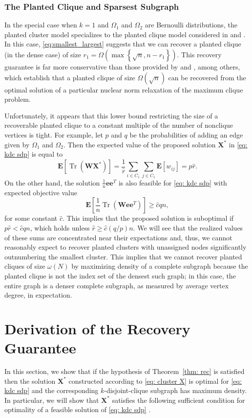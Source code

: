 \documentclass[twoside,11pt]{article}
\newcommand{\E}{\mathbf{E}}
\DeclareMathOperator{\tr}{{Tr}}
\newcommand{\e}{\bs {e}}
\newcommand{\bs}{\boldsymbol}
\newcommand{\X}{\bs {X}}
\newcommand{\W}{\bs {W}}
\newcommand{\0}{\bs{0}}
\newcommand{\sbra}[1] {\ensuremath{ \left[ #1\right]}} %
\newcommand{\rbra}[1]{\ensuremath{\left( #1 \right)}} %
\newcommand{\bra}[1]{\ensuremath{\left\{ #1 \right\}}} %
\newcommand{\kdc}{\(k\)-disjoint-clique }
\begin{document}
{\subsubsection{The Planted Clique and Sparsest Subgraph}

In the special case when $k=1$ and $\Omega_1$ and $\Omega_2$
are Bernoulli distributions, the planted cluster model
specializes to the planted clique model considered in
\cite{ames2011nuclear} and \cite{ames2015guaranteed}.
In this case, \eqref{eq:smallest_largest}
suggests that we can recover a planted clique (in the dense
case) of size $r_1 = \Omega \rbra{ \max \bra{\sqrt{n}, n - r_1 } }$.
This recovery guarantee is far more conservative than those
provided by \cite{ames2011nuclear} and \cite{ames2015guaranteed},
among others,
which establish that a planted clique
of size $\Omega(\sqrt n)$ can be recovered from the optimal solution
of a particular nuclear norm relaxation of the maximum clique problem.

Unfortunately, it appears that this lower bound restricting the size
of a recoverable planted clique
to a constant multiple of the number of nonclique vertices
is tight.
For example, let $p$ and $q$ be the probabilities of adding an edge
given by $\Omega_1$ and $\Omega_2$.
Then the expected value of the proposed solution $\X^*$
in \eqref{eq: kdc sdp}
is equal to
$$
	\E [ \tr(\W \X^*)] = \frac{1}{\hat r} \sum_{i \in C_1} \sum_{j \in C_1}
		\E[w_{ij} ] = p \hat r.
$$
On the other hand, the solution $\frac{1}{n} \e\e^T$ is also
feasible for \eqref{eq: kdc sdp} with expected objective value
$$
	\E \sbra{ \frac{1}{n} \tr(\W \e\e^T) }
	 \ge \hat c q n,
$$
for some constant $\hat c$.
This implies that the proposed solution is suboptimal if
$p \hat r < \hat c q n$, which holds unless $\hat r \ge \hat c (q/p) n$.
We will see that the realized values of these sums
are concentrated near their expectations and, thus, we cannot
reasonably expect to recover planted clusters with unassigned nodes significantly
outnumbering the smallest cluster. This implies that we cannot
recover planted cliques of size $\omega(N)$ by maximizing
density of a complete subgraph because the planted clique
is not the index set of the densest such graph; in this case, the
entire graph is a denser
complete subgraph, as measured by average vertex degree,
in expectation.

\section{Derivation of the Recovery Guarantee}
\label{sec: proof}
In this section, we show that if the hypothesis of Theorem~\ref{thm: rec} is satisfied
then the solution \(\X^*\) constructed according to \eqref{eq: cluster X}
is optimal for \eqref{eq: kdc sdp} and the corresponding \kdc subgraph has maximum density.
In particular, we will show that \(\X^*\) satisfies
the following sufficient condition for optimality of a feasible solution of \eqref{eq: kdc sdp}
\citep[see][Theorem 4.1]{ames2014guaranteed}.


}
\end{document}
